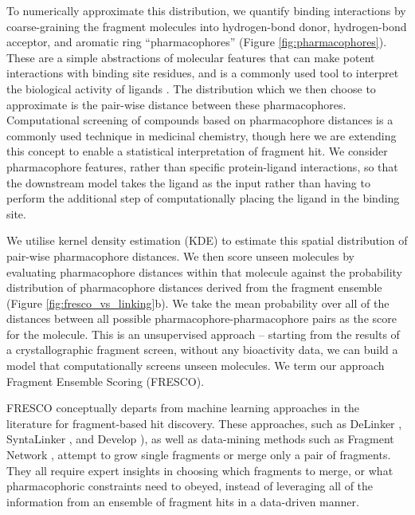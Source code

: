 To numerically approximate this distribution, we quantify binding interactions by coarse-graining the fragment molecules into hydrogen-bond donor, hydrogen-bond acceptor, and aromatic ring ``pharmacophores'' (Figure \ref{fig:pharmacophores}). These are a simple abstractions of molecular features that can make potent interactions with binding site residues, and is a commonly used tool to interpret the biological activity of ligands \cite{Kaserer2015PharmacophoreReview}. The distribution which we then choose to approximate is the pair-wise distance between these pharmacophores. Computational screening of compounds based on pharmacophore distances is a commonly used technique in medicinal chemistry, though here we are extending this concept to enable a statistical interpretation of fragment hit. We consider pharmacophore features, rather than specific protein-ligand interactions, so that the downstream model takes the ligand as the input rather than having to perform the additional step of computationally placing the ligand in the binding site. 


We utilise kernel density estimation (KDE) \cite{Parzen1962KDE} to estimate this spatial distribution of pair-wise pharmacophore distances. We then score unseen molecules by evaluating pharmacophore distances within that molecule against the probability distribution of pharmacophore distances derived from the fragment ensemble (Figure \ref{fig:fresco_vs_linking}b). We take the mean probability over all of the distances between all possible pharmacophore-pharmacophore pairs as the score for the molecule. This is an unsupervised approach -- starting from the results of a crystallographic fragment screen, without any bioactivity data, we can build a model that computationally screens unseen molecules. We term our approach Fragment Ensemble Scoring (FRESCO). 

FRESCO conceptually departs from machine learning approaches in the literature for fragment-based hit discovery. These approaches, such as DeLinker \cite{Imrie2020DeLinker},  SyntaLinker \cite{Yang2020SyntaLinker}, and Develop \cite{Imrie2021Develop}), as well as data-mining methods such as Fragment Network \cite{Hall2017FragNet}, attempt to grow single fragments or merge only a pair of fragments. They all require expert insights in choosing which fragments to merge, or what pharmacophoric constraints need to obeyed, instead of leveraging all of the information from an ensemble of fragment hits in a data-driven manner.

